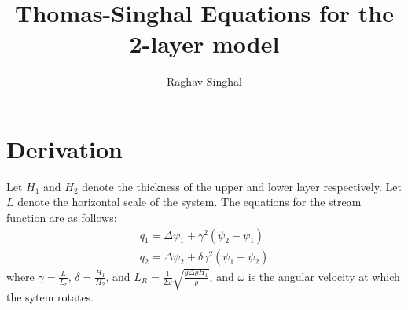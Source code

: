 \documentclass[12pt,twoside]{article}
\begin{document}
\title{Thomas-Singhal Equations for the 2-layer model}


\author{Raghav Singhal}

\maketitle

\section{Derivation}
Let $H_1$ and $H_2$ denote the thickness of the upper and lower layer respectively. Let $L$ denote the horizontal scale of the system. The equations for the stream function are as follows:
\begin{align}
q_1=\Delta \psi_1 + \gamma^2(\psi_2-\psi_1)\\
q_2=\Delta \psi_2 + \delta \gamma^2(\psi_1-\psi_2)
\end{align}
where $\gamma=\frac{L}{L_r}$, $\delta=\frac{H_1}{H_2}$, and $L_R=\frac{1}{2 \omega}\sqrt{\frac{g \Delta \rho H_1}{\rho}}$, and $\omega$ is the angular velocity at which the sytem rotates.
\end{document}
